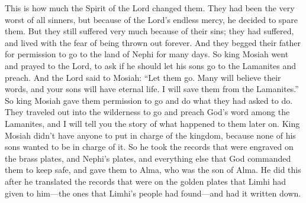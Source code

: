 This is how much the Spirit of the Lord changed them. They had been the very worst of all sinners, but because of the Lord's endless mercy, he decided to spare them. But they still suffered very much because of their sins; they had suffered, and lived with the fear of being thrown out forever.
\bverse \iffalse And it came to pass that they did plead with their father many days that they might go up to the land of Nephi. \fi
And they begged their father for permission to go to the land of Nephi for many days.
\bverse \iffalse And king Mosiah went and inquired of the Lord if he should let his sons go up among the Lamanites to preach the word. \fi
So king Mosiah went and prayed to the Lord, to ask if he should let his sons go to the Lamanites and preach.
\bverse \iffalse And the Lord said unto Mosiah: Let them go up, for many shall believe on their words, and they shall have eternal life; and I will deliver thy sons out of the hands of the Lamanites. \fi
And the Lord said to Mosiah: ``Let them go. Many will believe their words, and your sons will have eternal life. I will save them from the Lamanites.''
\bverse \iffalse And it came to pass that Mosiah granted that they might go and do according to their request. \fi
So king Mosiah gave them permission to go and do what they had asked to do.
\bverse \iffalse And they took their journey into the wilderness to go up to preach the word among the Lamanites; and I shall give an account of their proceedings hereafter. \fi
They traveled out into the wilderness to go and preach God's word among the Lamanites, and I will tell you the story of what happened to them later on.
\bverse \iffalse Now king Mosiah had no one to confer the kingdom upon, for there was not any of his sons who would accept of the kingdom. \fi
King Mosiah didn't have anyone to put in charge of the kingdom, because none of his sons wanted to be in charge of it.
\bverse \iffalse Therefore he took the records which were engraven on the plates of brass, and also the plates of Nephi, and all the things which he had kept and preserved according to the commandments of God, after having translated and caused to be written the records which were on the plates of gold which had been found by the people of Limhi, which were delivered to him by the hand of Limhi; \fi
So he took the records that were engraved on the brass plates, and Nephi's plates, and everything else that God commanded them to keep safe, and gave them to Alma, who was the son of Alma. He did this after he translated the records that were on the golden plates that Limhi had given to him---the ones that Limhi's people had found---and had it written down.

